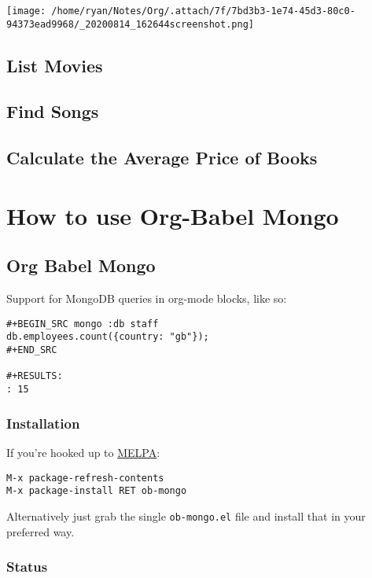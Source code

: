 \documentclass[11pt]{article}
\begin{document}
\begin{center}
\texttt{[image: /home/ryan/Notes/Org/.attach/7f/7bd3b3-1e74-45d3-80c0-94373ead9968/\_20200814\_162644screenshot.png]}
\end{center}



\subsection{List Movies}
\label{sec:org137624a}
\subsection{Find Songs}
\label{sec:org3edf32c}
\subsection{Calculate the Average Price of Books}
\label{sec:org5b0daf1}

\section{How to use Org-Babel Mongo}
\label{sec:orge20ee8d}
\subsection{Org Babel Mongo}
\label{sec:orgd7278cc}

Support for MongoDB queries in org-mode blocks, like so:

\begin{verbatim}
#+BEGIN_SRC mongo :db staff
db.employees.count({country: "gb"});
#+END_SRC

#+RESULTS:
: 15
\end{verbatim}

\subsubsection{Installation}
\label{sec:org51e78c9}

If you're hooked up to \href{http://melpa.milkbox.net/}{MELPA}:

\begin{verbatim}
M-x package-refresh-contents
M-x package-install RET ob-mongo
\end{verbatim}

Alternatively just grab the single \texttt{ob-mongo.el} file and install that in your preferred way.

\subsubsection{Status}
\label{sec:org4cbf32c}
\end{document}
